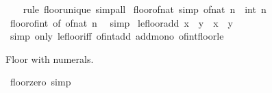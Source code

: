 \begin{isabellebody}
%
\isadelimproof
\ \ %
\endisadelimproof
%
\isatagproof
{}\isamarkupfalse%
\ {\isacharparenleft}{\kern0pt}rule\ floor{\isacharunderscore}{\kern0pt}unique{\isacharparenright}{\kern0pt}\ simp{\isacharunderscore}{\kern0pt}all%
\endisatagproof
{\isafoldproof}%
%
\isadelimproof
\isanewline
%
\endisadelimproof
\isanewline
{}\isamarkupfalse%
\ floor{\isacharunderscore}{\kern0pt}of{\isacharunderscore}{\kern0pt}nat\ {\isacharbrackleft}{\kern0pt}simp{\isacharbrackright}{\kern0pt}{\isacharcolon}{\kern0pt}\ {\isachardoublequoteopen}{\isasymlfloor}of{\isacharunderscore}{\kern0pt}nat\ n{\isasymrfloor}\ {\isacharequal}{\kern0pt}\ int\ n{\isachardoublequoteclose}\isanewline
%
\isadelimproof
\ \ %
\endisadelimproof
%
\isatagproof
{}\isamarkupfalse%
\ floor{\isacharunderscore}{\kern0pt}of{\isacharunderscore}{\kern0pt}int\ {\isacharbrackleft}{\kern0pt}of\ {\isachardoublequoteopen}of{\isacharunderscore}{\kern0pt}nat\ n{\isachardoublequoteclose}{\isacharbrackright}{\kern0pt}\ \isamarkupfalse%
\ simp%
\endisatagproof
{\isafoldproof}%
%
\isadelimproof
\isanewline
%
\endisadelimproof
\isanewline
{}\isamarkupfalse%
\ le{\isacharunderscore}{\kern0pt}floor{\isacharunderscore}{\kern0pt}add{\isacharcolon}{\kern0pt}\ {\isachardoublequoteopen}{\isasymlfloor}x{\isasymrfloor}\ {\isacharplus}{\kern0pt}\ {\isasymlfloor}y{\isasymrfloor}\ {\isasymle}\ {\isasymlfloor}x\ {\isacharplus}{\kern0pt}\ y{\isasymrfloor}{\isachardoublequoteclose}\isanewline
%
\isadelimproof
\ \ %
\endisadelimproof
%
\isatagproof
{}\isamarkupfalse%
\ {\isacharparenleft}{\kern0pt}simp\ only{\isacharcolon}{\kern0pt}\ le{\isacharunderscore}{\kern0pt}floor{\isacharunderscore}{\kern0pt}iff\ of{\isacharunderscore}{\kern0pt}int{\isacharunderscore}{\kern0pt}add\ add{\isacharunderscore}{\kern0pt}mono\ of{\isacharunderscore}{\kern0pt}int{\isacharunderscore}{\kern0pt}floor{\isacharunderscore}{\kern0pt}le{\isacharparenright}{\kern0pt}%
\endisatagproof
{\isafoldproof}%
%
\isadelimproof
%
\endisadelimproof
%
\begin{isamarkuptext}%
Floor with numerals.%
\end{isamarkuptext}\isamarkuptrue%
\isamarkupfalse%
\ floor{\isacharunderscore}{\kern0pt}zero\ {\isacharbrackleft}{\kern0pt}simp{\isacharbrackright}{\kern0pt}{\isacharcolon}{\kern0pt}\ {\isachardoublequoteopen}{\isasymlfloor}{}{\isasymrfloor}\ {\isacharequal}{\kern0pt}\ {}{\isachardoublequoteclose}\isanewline
%
\isadelimproof
\ \ %
\endisadelimproof
%
\isatagproof
{}\isamarkupfalse%

\end{isabellebody}
